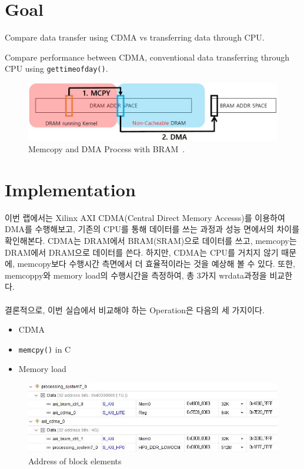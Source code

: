 \documentclass{article}
\begin{document}
\pagestyle{fancy}

\section*{Goal}
\begin{itemize*}
\item Compare data transfer using CDMA vs transferring data through CPU.
\item Compare performance between CDMA, conventional data transferring through CPU using \linebreak \texttt{gettimeofday()}.
\end{itemize*}
\begin{figure}[ht]
	\centering
	\includegraphics[width=1\textwidth]{fig/overview.jpg}
\caption{Memcopy and DMA Process with BRAM~\cite{lab11}.}
\label{fig1}
\end{figure}

\section{Implementation}
이번 랩에서는 Xilinx AXI CDMA(Central Direct Memory Accesss)를 이용하여 DMA를 수행해보고, 기존의 CPU를 통해 데이터를 쓰는 과정과 성능 면에서의 차이를 확인해본다. CDMA는 DRAM에서 BRAM(SRAM)으로 데이터를 쓰고, memcopy는 DRAM에서 DRAM으로 데이터를 쓴다. 하지만, CDMA는 CPU를 거치지 않기 때문에, memcopy보다 수행시간 측면에서 더 효율적이라는 것을 예상해 볼 수 있다. 또한, memcoppy와 memory load의 수행시간을 측정하여, 총 3가지 wrdata과정을 비교한다.\\\\
결론적으로, 이번 실습에서 비교해야 하는 Operation은 다음의 세 가지이다.
\begin{itemize}
  \setlength\itemsep{-0.5em}
    \item CDMA
    \item \texttt{memcpy()} in C
    \item Memory load
\end{itemize}

\begin{figure}[ht]
	\centering
	\includegraphics[width=1\textwidth]{fig/address.jpg}
\caption{Address of block elements}
\label{fig2}
\end{figure}
\newpage
\end{document}
